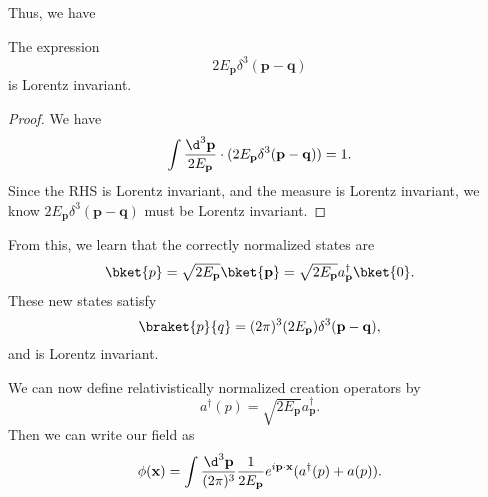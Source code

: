 \documentclass[a4paper]{article}
\begin{document}
Thus, we have
\begin{prop}
  The expression
  \[
    2E_\mathbf{p} \delta^3 (\mathbf{p} - \mathbf{q})
  \]
  is Lorentz invariant.
\end{prop}

\begin{proof}
  We have
  \[
    \int \frac{\d^3 \mathbf{p}}{2 E_\mathbf{p}} \cdot (2E_\mathbf{p} \delta^3(\mathbf{p} - \mathbf{q})) = 1.
  \]
  Since the RHS is Lorentz invariant, and the measure is Lorentz invariant, we know $2E_\mathbf{p} \delta^3(\mathbf{p} - \mathbf{q})$ must be Lorentz invariant.
\end{proof}

From this, we learn that the correctly normalized states are
\[
  \bket{p} = \sqrt{2 E_\mathbf{p}}\bket{\mathbf{p}} = \sqrt{2 E_\mathbf{p}} a_\mathbf{p}^\dagger \bket{0}.
\]
These new states satisfy
\[
  \braket{p}{q} = (2\pi)^3 (2E_\mathbf{p}) \delta^3 (\mathbf{p} - \mathbf{q}),
\]
and is Lorentz invariant.

We can now define relativistically normalized creation operators by
\[
  a^\dagger(p) = \sqrt{2E_\mathbf{p}} a_\mathbf{p}^\dagger.
\]
Then we can write our field as
\[
  \phi (\mathbf{x}) = \int \frac{\d^3 \mathbf{p}}{(2\pi)^3}\frac{1}{2E_\mathbf{p}} e^{i\mathbf{p}\cdot \mathbf{x}}(a^\dagger(p) + a(p)).
\]
\end{document}
